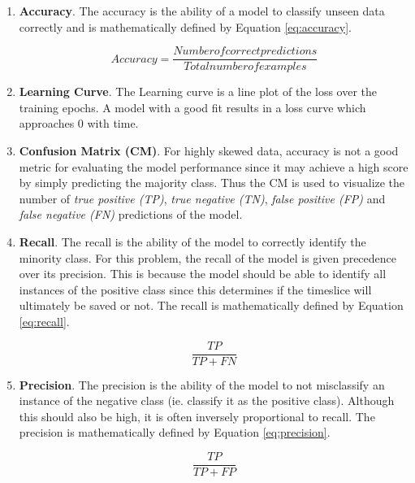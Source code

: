 \begin{enumerate}
\item \textbf{Accuracy}. The accuracy is the ability of a model to
  classify unseen data correctly and is mathematically defined by
  Equation \ref{eq:accuracy}.

  \begin{equation}
    Accuracy = \frac{Number of correct predictions}{Total number of examples}
    \label{eq:accuracy}
  \end{equation}
  
\item \textbf{Learning Curve}. The Learning curve is a line plot of
  the loss over the training epochs. A model with a good fit results
  in a loss curve which approaches 0 with time.
  
\item \textbf{Confusion Matrix (CM)}. For highly skewed data, accuracy
  is not a good metric for evaluating the model performance
  \cite{branco2015survey} since it may achieve a high score by simply
  predicting the majority class. Thus the CM is used to visualize the
  number of \emph {true positive (TP)}, \emph{true negative (TN)},
  \emph{false positive (FP)} and \emph{false negative (FN)}
  predictions of the model.
\item \textbf{Recall}. The recall is the ability of the model to
  correctly identify the minority class. For this problem, the recall
  of the model is given precedence over its precision. This is because
  the model should be able to identify all instances of the positive
  class since this determines if the timeslice will ultimately be
  saved or not. The recall is mathematically defined by Equation
  \ref{eq:recall}.

  \begin{equation}
    \frac{TP}{TP + FN}
    \label{eq:recall}
  \end{equation}

\item \textbf{Precision}. The precision is the ability of the model to
  not misclassify an instance of the negative class (ie. classify it
  as the positive class). Although this should also be high, it is
  often inversely proportional to recall. The precision is
  mathematically defined by Equation \ref{eq:precision}.

  \begin{equation}
    \frac{TP}{TP + FP}
    \label{eq:precision}
  \end{equation}


\end{enumerate}
